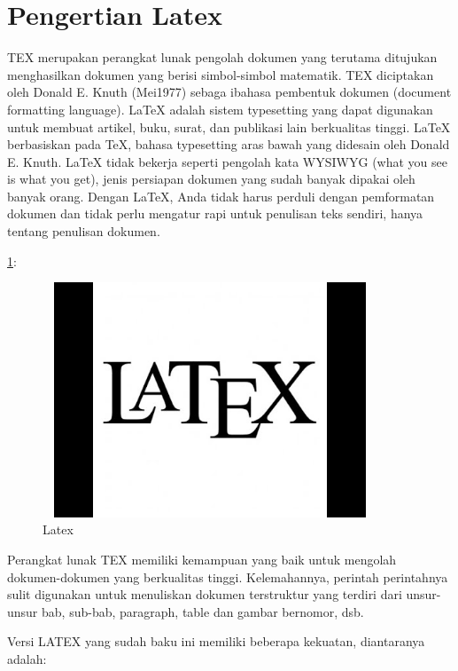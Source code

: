 \section {Pengertian Latex}\par



TEX merupakan perangkat lunak pengolah dokumen yang terutama ditujukan menghasilkan dokumen yang berisi simbol-simbol matematik. TEX diciptakan oleh Donald E. Knuth (Mei1977) sebaga ibahasa pembentuk dokumen (document formatting language). LaTeX adalah sistem typesetting yang dapat digunakan untuk membuat artikel, buku, surat, dan publikasi lain berkualitas tinggi. LaTeX berbasiskan pada TeX, bahasa typesetting aras bawah yang didesain oleh Donald E. Knuth. LaTeX tidak bekerja seperti pengolah kata WYSIWYG (what you see is what you get), jenis persiapan dokumen yang sudah banyak dipakai oleh banyak orang. Dengan LaTeX, Anda tidak harus perduli dengan pemformatan dokumen dan tidak perlu mengatur rapi untuk penulisan teks sendiri, hanya tentang penulisan dokumen.


\ref{latex.jpg}:
\begin{figure}[ht]
	\centerline{\includegraphics[width=10cm,height=7cm]{gambar/latex.jpg}}
	\caption{Latex}
	\label{latex.jpg}
\end{figure}

Perangkat lunak TEX memiliki kemampuan yang baik untuk mengolah dokumen-dokumen yang berkualitas tinggi. Kelemahannya, perintah perintahnya sulit digunakan untuk menuliskan dokumen terstruktur yang terdiri dari unsur-unsur bab, sub-bab, paragraph, table dan gambar bernomor, dsb.\par 
\vspace{12pt}

Versi LATEX yang sudah baku ini memiliki beberapa kekuatan, diantaranya adalah:

